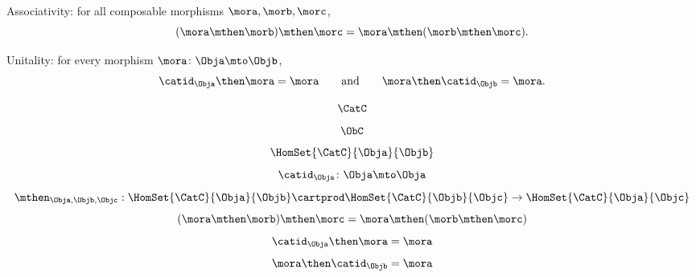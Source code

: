 {\begin{forslides}
\begin{ctdefinition}
\begin{body}
\begin{compactenum}
                \end{compactenum}
                \condit
                \begin{compactenum}
                    \item Associativity: for all composable morphisms $\mora, \morb, \morc$,
                    $$ (\mora\mthen \morb)
                    \mthen \morc= \mora \mthen (\morb \mthen \morc).$$
                    \item Unitality: for every morphism $\mora \colon \Obja \mto \Objb$,
                    $$ \catid_{\Obja} \then \mora = \mora \quad \quad \text{and} \quad \quad \mora \then \catid_{\Objb} = \mora. $$
                \end{compactenum}
            \end{body}
        \end{ctdefinition}
        \begin{equation}
            \label{eq:15}
            \CatC
        \end{equation}
        \begin{equation}
            \label{eq:16}
            \ObC
        \end{equation}
        \begin{equation}
            \label{eq:17}
            \HomSet{\CatC}{\Obja}{\Objb}
        \end{equation}
        \begin{equation}
            \label{eq:18}
            \catid_{\Obja}\colon \Obja \mto \Obja
        \end{equation}
        \begin{equation}
            \label{eq:19}
            \mthen_{\Obja,\Objb,\Objc}: \HomSet{\CatC}{\Obja}{\Objb} \cartprod \HomSet{\CatC}{\Objb}{\Objc}\to \HomSet{\CatC}{\Obja}{\Objc}
        \end{equation}
        \begin{equation}
            \label{eq:20}
            (\mora\mthen \morb)
            \mthen \morc= \mora \mthen (\morb \mthen \morc)
        \end{equation}
        \begin{equation}
            \label{eq:21}
            \catid_{\Obja} \then \mora = \mora
        \end{equation}
        \begin{equation}
            \label{eq:22}
            \mora \then \catid_{\Objb} = \mora
        \end{equation}

\end{forslides}}
